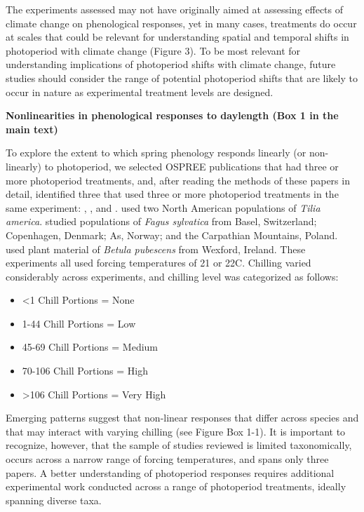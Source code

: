 \documentclass{article}
\begin{document}
\par The experiments assessed may not have originally aimed at assessing effects of climate change on phenological responses, yet in many cases, treatments do occur at scales that could be relevant for understanding spatial and temporal shifts in photoperiod with climate change (Figure 3). To be most relevant for understanding implications of photoperiod shifts with climate change, future studies should consider the range of potential photoperiod shifts that are likely to occur in nature as experimental treatment levels are designed.   

\par \textbf{Nonlinearities in phenological responses to daylength (Box 1 in the main text)}
\par To explore the extent to which spring phenology responds linearly (or non-linearly) to photoperiod, we selected OSPREE publications that had three or more photoperiod treatments, and, after reading the methods of these papers in detail, identified three that used three or more photoperiod treatments in the same experiment: \citet{Ashby:1962aa}, \citet{Heide:1993a}, and \citet{Caffarra:2011b}. \citet{Ashby:1962aa} used two North American populations of \textit{Tilia america}. \citet{Heide:1993a} studied populations of \textit{Fagus sylvatica} from Basel, Switzerland; Copenhagen, Denmark; As, Norway; and the Carpathian Mountains, Poland. \citet{Caffarra:2011b} used plant material of \textit{Betula pubescens} from Wexford, Ireland. These experiments all used forcing temperatures of 21 or 22\degree C. Chilling varied considerably across experiments, and chilling level was categorized as follows:
\begin{itemize}
\item <1 Chill Portions = None
\item 1-44 Chill Portions = Low
\item 45-69 Chill Portions = Medium 
\item 70-106 Chill Portions = High
\item >106 Chill Portions = Very High
\end{itemize}

\par Emerging patterns suggest that non-linear responses that differ across species and that may interact with varying chilling (see Figure Box 1-1). It is important to recognize, however, that the sample of studies reviewed is limited taxonomically, occurs across a narrow range of forcing temperatures, and spans only three papers. A better understanding of photoperiod responses requires additional experimental work conducted across a range of photoperiod treatments, ideally spanning diverse taxa.
\end{document}
